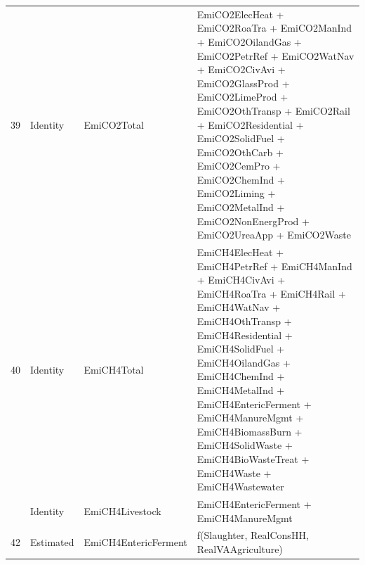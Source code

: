 \begin{table}
\begin{tabular}[t]{rll>{\raggedright\arraybackslash}p{10cm}}
39 & Identity & EmiCO2Total & EmiCO2ElecHeat + EmiCO2RoaTra + EmiCO2ManInd + EmiCO2OilandGas + EmiCO2PetrRef + EmiCO2WatNav + EmiCO2CivAvi + EmiCO2GlassProd + EmiCO2LimeProd + EmiCO2OthTransp + EmiCO2Rail + EmiCO2Residential + EmiCO2SolidFuel + EmiCO2OthCarb + EmiCO2CemPro + EmiCO2ChemInd + EmiCO2Liming + EmiCO2MetalInd + EmiCO2NonEnergProd + EmiCO2UreaApp + EmiCO2Waste\\
40 & Identity & EmiCH4Total & EmiCH4ElecHeat + EmiCH4PetrRef + EmiCH4ManInd + EmiCH4CivAvi + EmiCH4RoaTra + EmiCH4Rail + EmiCH4WatNav + EmiCH4OthTransp + EmiCH4Residential + EmiCH4SolidFuel + EmiCH4OilandGas + EmiCH4ChemInd + EmiCH4MetalInd + EmiCH4EntericFerment + EmiCH4ManureMgmt + EmiCH4BiomassBurn + EmiCH4SolidWaste + EmiCH4BioWasteTreat + EmiCH4Waste + EmiCH4Wastewater\\
\addlinespace
41 & Identity & EmiCH4Livestock & EmiCH4EntericFerment + EmiCH4ManureMgmt\\
42 & Estimated & EmiCH4EntericFerment & f(Slaughter, RealConsHH, RealVAAgriculture)\\
\bottomrule
\end{tabular}
\end{table}
